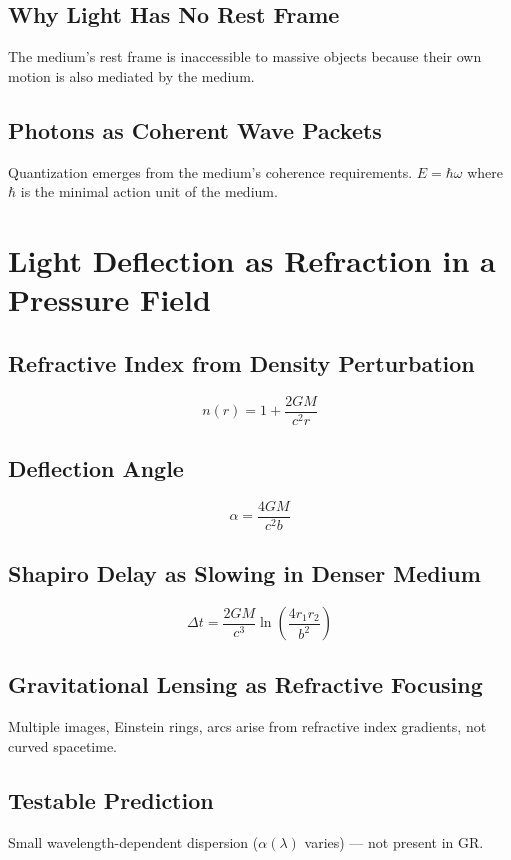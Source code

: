 \documentclass[12pt, a4paper]{article}
\begin{document}
\subsection{Why Light Has No Rest Frame}

The medium's rest frame is inaccessible to massive objects because their own motion is also mediated by the medium.

\subsection{Photons as Coherent Wave Packets}

Quantization emerges from the medium's coherence requirements. \( E = \hbar \omega \) where \( \hbar \) is the minimal action unit of the medium.

\section{Light Deflection as Refraction in a Pressure Field}

\subsection{Refractive Index from Density Perturbation}
\[
n(r) = 1 + \frac{2GM}{c^2 r}
\]

\subsection{Deflection Angle}
\[
\alpha = \frac{4GM}{c^2 b}
\]

\subsection{Shapiro Delay as Slowing in Denser Medium}
\[
\Delta t = \frac{2GM}{c^3} \ln \left( \frac{4r_1 r_2}{b^2} \right)
\]

\subsection{Gravitational Lensing as Refractive Focusing}

Multiple images, Einstein rings, arcs arise from refractive index gradients, not curved spacetime.

\subsection{Testable Prediction}

Small wavelength-dependent dispersion (\( \alpha(\lambda) \) varies) — not present in GR.
\end{document}
